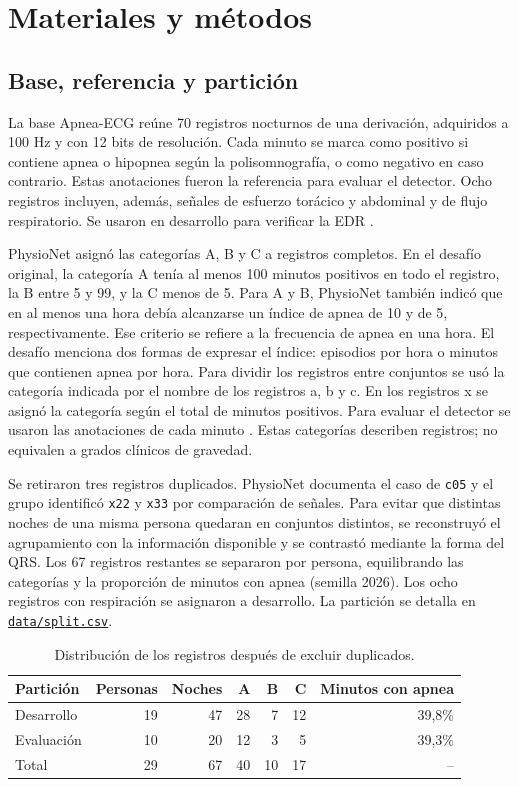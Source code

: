 \documentclass[10pt,a4paper]{article}
\newcommand{\repositorio}{https://github.com/afrateitba/PSIB2026Q2-TPS-Grupo08-Frate-Tenca-Weizman}
\begin{document}
\section{Materiales y métodos}
\subsection{Base, referencia y partición}
La base Apnea-ECG reúne 70 registros nocturnos de una derivación, adquiridos a 100 Hz y con 12 bits de resolución. Cada minuto se marca como positivo si contiene apnea o hipopnea según la polisomnografía, o como negativo en caso contrario. Estas anotaciones fueron la referencia para evaluar el detector. Ocho registros incluyen, además, señales de esfuerzo torácico y abdominal y de flujo respiratorio. Se usaron en desarrollo para verificar la EDR \cite{physionet}.

PhysioNet asignó las categorías A, B y C a registros completos. En el desafío original, la categoría A tenía al menos 100 minutos positivos en todo el registro, la B entre 5 y 99, y la C menos de 5. Para A y B, PhysioNet también indicó que en al menos una hora debía alcanzarse un índice de apnea de 10 y de 5, respectivamente. Ese criterio se refiere a la frecuencia de apnea en una hora. El desafío menciona dos formas de expresar el índice: episodios por hora o minutos que contienen apnea por hora. Para dividir los registros entre conjuntos se usó la categoría indicada por el nombre de los registros a, b y c. En los registros x se asignó la categoría según el total de minutos positivos. Para evaluar el detector se usaron las anotaciones de cada minuto \cite{challenge}. Estas categorías describen registros; no equivalen a grados clínicos de gravedad.

Se retiraron tres registros duplicados. PhysioNet documenta el caso de \texttt{c05} y el grupo identificó \texttt{x22} y \texttt{x33} por comparación de señales. Para evitar que distintas noches de una misma persona quedaran en conjuntos distintos, se reconstruyó el agrupamiento con la información disponible y se contrastó mediante la forma del QRS. Los 67 registros restantes se separaron por persona, equilibrando las categorías y la proporción de minutos con apnea (semilla 2026). Los ocho registros con respiración se asignaron a desarrollo. La partición se detalla en \href{\repositorio/blob/main/data/split.csv}{\texttt{data/split.csv}}.

\begin{table}[htbp]\centering
\caption{Distribución de los registros después de excluir duplicados.}
\begin{tabular}{lrrrrrr}\toprule
Partición & Personas & Noches & A & B & C & Minutos con apnea \\ \midrule
Desarrollo & 19 & 47 & 28 & 7 & 12 & 39,8\% \\
Evaluación & 10 & 20 & 12 & 3 & 5 & 39,3\% \\
Total & 29 & 67 & 40 & 10 & 17 & -- \\ \bottomrule
\end{tabular}\end{table}
\end{document}
